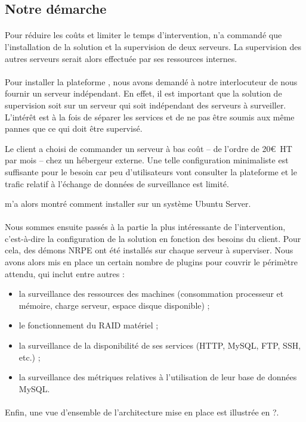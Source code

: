 \subsection{Notre démarche}

\paragraph{}
Pour réduire les coûts et limiter le temps d'intervention, \adacast{} n'a commandé que l'installation de la solution \acentreon{} et la supervision de deux serveurs.
La supervision des autres serveurs serait alors effectuée par ses ressources internes.

\paragraph{}
Pour installer la plateforme \acentreon{}, nous avons demandé à notre interlocuteur de nous fournir un serveur indépendant.
En effet, il est important que la solution de supervision soit sur un serveur qui soit indépendant des serveurs à surveiller.
L'intérêt est à la fois de séparer les services et de ne pas être soumis aux même pannes que ce qui doit être supervisé.

Le client a choisi de commander un serveur à bas coût -- de l'ordre de 20\euro~HT par mois -- chez un hébergeur externe.
Une telle configuration minimaliste est suffisante pour le besoin car peu d'utilisateurs vont consulter la plateforme \acentreon{} et le trafic relatif à l'échange de données de surveillance est limité.

\asegir{} m'a alors montré comment installer \acentreon{} sur un système \alinux{} Ubuntu Server.

\paragraph{}
Nous sommes ensuite passés à la partie la plus intéressante de l'intervention, c'est-à-dire la configuration de la solution en fonction des besoins du client.
Pour cela, des démons NRPE ont été installés sur chaque serveur à superviser.
Nous avons alors mis en place un certain nombre de plugins pour couvrir le périmètre attendu, qui inclut entre autres :

\begin{itemize}
	\item la surveillance des ressources des machines (consommation processeur et mémoire, charge serveur, espace disque disponible) ;
	\item le fonctionnement du RAID matériel ;
	\item la surveillance de la disponibilité de ses services (HTTP, MySQL, FTP, SSH, etc.) ;
	\item la surveillance des métriques relatives à l'utilisation de leur base de données MySQL.
\end{itemize}

\paragraph{}
Enfin, une vue d'ensemble de l'architecture mise en place est illustrée en ?.


